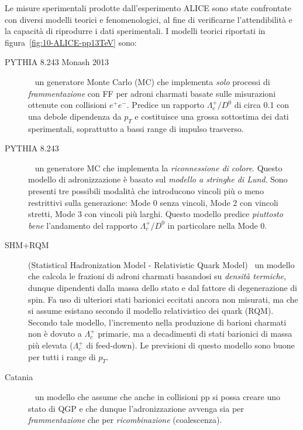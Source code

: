         Le misure sperimentali prodotte dall'esperimento ALICE sono state confrontate con diversi modelli teorici e fenomenologici, al fine di verificarne l'attendibilità e la capacità di riprodurre i dati sperimentali. I modelli teorici riportati in figura~\ref{fig:10-ALICE-pp13TeV} sono:
        \begin{description}
            \item[PYTHIA 8.243 Monash 2013]~\cite{SCR_2014} un generatore Monte Carlo (MC) che implementa \textit{solo} processi di \textit{frammentazione} con FF per adroni charmati basate sulle misurazioni ottenute con collisioni $e^{+} e^{-}$. Predice un rapporto $\Lambda_{c}^{+}/D^{0}$ di circa \num{0.1} con una debole dipendenza da $p_{T}$ e costituisce una grossa sottostima dei dati sperimentali, soprattutto a bassi range di impulso trasverso.

            \item[PYTHIA 8.243]~\cite{CS_2015} un generatore MC che implementa la \textit{riconnessione di colore}. Questo modello di adronizzazione è basato sul \textit{modello a stringhe di Lund}. Sono presenti tre possibili modalità che introducono vincoli più o meno restrittivi sulla generazione: Mode 0 senza vincoli, Mode 2 con vincoli stretti, Mode 3 con vincoli più larghi. Questo modello predice \textit{piuttosto bene} l’andamento del rapporto $\Lambda_{c}^{+}/D^{0}$ in particolare nella Mode 0.

            \item[SHM+RQM] (Statistical Hadronization Model - Relativistic Quark Model)~\cite{MR_2019} un modello che calcola le frazioni di adroni charmati basandosi su \textit{densità termiche}, dunque dipendenti dalla massa dello stato e dal fattore di degenerazione di spin. Fa uso di ulteriori stati barionici eccitati ancora non misurati, ma che si assume esistano secondo il modello relativistico dei quark (RQM). Secondo tale modello, l'incremento nella produzione di barioni charmati non è dovuto a $\Lambda_{c}^{+}$ primarie, ma a decadimenti di stati barionici di massa più elevata ($\Lambda_{c}^{+}$ di feed-down). Le previsioni di questo modello sono buone per tutti i range di $p_{T}$.

            \item[Catania]~\cite{PMDCG_2018} un modello che assume che anche in collisioni pp si possa creare uno stato di QGP e che dunque l’adronizzazione avvenga sia per \textit{frammentazione} che per \textit{ricombinazione} (coalescenza).
            

\end{description}
